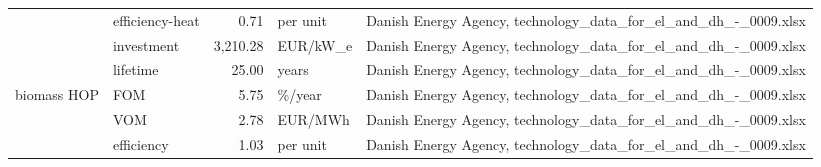 \begin{longtable}{p{5cm}p{3cm}rp{3cm}p{11cm}}
                      & efficiency-heat &           0.71 &                          per unit &                                                                                                                                                                                                                                                                      Danish Energy Agency, technology\_data\_for\_el\_and\_dh\_-\_0009.xlsx \\
                      & investment &       3,210.28 &                          EUR/kW\_e &                                                                                                                                                                                                                                                                      Danish Energy Agency, technology\_data\_for\_el\_and\_dh\_-\_0009.xlsx \\
                      & lifetime &          25.00 &                             years &                                                                                                                                                                                                                                                                      Danish Energy Agency, technology\_data\_for\_el\_and\_dh\_-\_0009.xlsx \\
biomass HOP & FOM &           5.75 &                            \%/year &                                                                                                                                                                                                                                                                      Danish Energy Agency, technology\_data\_for\_el\_and\_dh\_-\_0009.xlsx \\
                      & VOM &           2.78 &                           EUR/MWh &                                                                                                                                                                                                                                                                      Danish Energy Agency, technology\_data\_for\_el\_and\_dh\_-\_0009.xlsx \\
                      & efficiency &           1.03 &                          per unit &                                                                                                                                                                                                                                                                      Danish Energy Agency, technology\_data\_for\_el\_and\_dh\_-\_0009.xlsx \\

\end{longtable}
